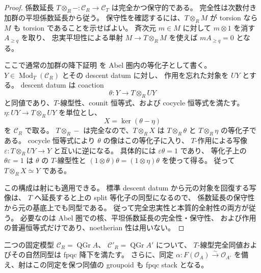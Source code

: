 \begin{proof}
係数延長 $T\otimes_R-:\mathcal C_R\to\mathcal C_T$ は完全かつ保守的である。
完全性は次数付き加群の平坦係数延長から従う。
保守性を確認するには、$T\otimes_RM$ が torsion なら
$M$ も torsion であることを示せばよい。
斉次元 $m\in M$ に対して $m\otimes1$ を消す $A_{\ge q}$ を取り、
忠実平坦性による単射 $M\to T\otimes_RM$ を使えば
$mA_{\ge q}=0$ となる。

ここで通常の加群の降下証明
\cite[Proposition~35.3.9, Tag~023N]{NFMStacksModuleDescent}
を Abel 圏内の等化子として書く。
$Y\in\operatorname{Mod}_T(\mathcal C_R)$ とその descent datum に対し、
作用を忘れた対象を $UY$ とする。
descent datum は coaction
\[
 \theta:Y\longrightarrow T\otimes_RUY
\]
と同値であり、$T$-線型性、counit 恒等式、および cocycle 恒等式を満たす。
$\eta:UY\to T\otimes_RUY$ を単位とし、
\[
 X=\ker(\theta-\eta)
\]
を $\mathcal C_R$ で取る。
$T\otimes_R-$ は完全なので、$T\otimes_RX$ は
$T\otimes_R\theta$ と $T\otimes_R\eta$ の等化子である。
cocycle 恒等式により $\theta$ の像はこの等化子に入り、
$T$-作用による写像 $\varepsilon:T\otimes_RUY\to Y$ と互いに逆になる。
具体的には $\varepsilon\theta=1$ であり、
等化子上の $\theta\varepsilon=1$ は
$\theta$ の $T$-線型性と
$(1\otimes\theta)\theta=(1\otimes\eta)\theta$ を使って得る。
従って $T\otimes_RX\simeq Y$ である。

この構成は射にも適用できる。
標準 descent datum から元の対象を回復する写像は、
$T$ へ延長すると上の split 等化子の同型になるので、
係数延長の保守性から元の基底上でも同型である。
従って完全忠実性と本質的全射性の両方が従う。
必要なのは Abel 圏での核、平坦係数延長の完全性・保守性、
および作用の普遍恒等式だけであり、noetherian 性は用いない。
\end{proof}

\begin{proposition}[固定模型間の関手と自然同型の降下]
\label{prop:nfm-equivalence-descent}
二つの固定模型 $\mathcal C_R=\operatorname{QGr}A$、
$\mathcal C'_R=\operatorname{QGr}A'$ について、
$T$-線型完全同値およびその自然同型は fpqc 降下を満たす。
さらに、同定 $\alpha:F(\mathcal O_A)\xrightarrow{\sim}\mathcal O_{A'}$
を備え、射はこの同定を保つ同値の groupoid も fpqc stack となる。
\end{proposition}

